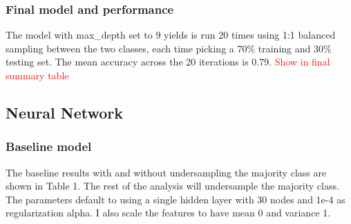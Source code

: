 \documentclass{article}
\newcommand\todo[1]{\textcolor{red}{#1}}
\begin{document}
\subsubsection*{Final model and performance}

The model with max\_depth set to 9 yields is run 20 times using 1:1 balanced sampling between the two classes, each time picking a 70\% training and 30\% testing set. The mean accuracy across the 20 iterations is 0.79. \todo{Show in final summary table}

\subsection{Neural Network}

\subsubsection*{Baseline model}

The baseline results with and without undersampling the majority class are shown in Table 1. The rest of the analysis will undersample the majority class. The parameters default to using a single hidden layer with 30 nodes and 1e-4 as regularization alpha. I also scale the features to have mean 0 and variance 1. 
\end{document}
